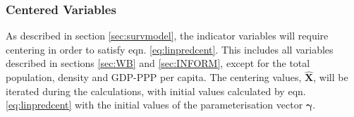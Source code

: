 \documentclass[10pt,a4paper]{article}
\begin{document}
\begin{multicols}{1}
\subsubsection{Centered Variables}\label{sec:centerings}
As described in section \ref{sec:survmodel}, the indicator variables will require centering in order to satisfy eqn. \ref{eq:linpredcent}. This includes all variables described in sections \ref{sec:WB} and \ref{sec:INFORM}, except for the total population, density and GDP-PPP per capita. The centering values, $\hat{\mathbf{X}}$, will be iterated during the calculations, with initial values calculated by eqn. \ref{eq:linpredcent} with the initial values of the parameterisation vector $\boldsymbol{\gamma}$.

\end{multicols}
\end{document}
